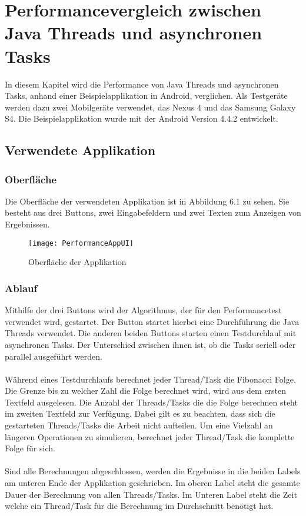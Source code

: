 \chapter[Performancevergleich zwischen Java Threads und asynchronen Tasks] {Performancevergleich zwischen Java Threads und asynchronen Tasks}       
\label{cha:performance}

In diesem Kapitel wird die Performance von Java Threads und asynchronen Tasks, anhand einer Beispielapplikation in Android, verglichen. Als Testgeräte werden dazu zwei Mobilgeräte verwendet, das Nexus 4 und das Samsung Galaxy S4. Die Beispielapplikation wurde mit der Android Version 4.4.2 entwickelt.

\section{Verwendete Applikation}
\subsection{Oberfläche}
Die Oberfläche der verwendeten Applikation ist in Abbildung 6.1 zu sehen. Sie besteht aus drei Buttons, zwei Eingabefeldern und zwei Texten zum Anzeigen von Ergebnissen.

\begin{figure}
\centering
\texttt{[image: PerformanceAppUI]}
\caption{Oberfläche der Applikation}
\label{fig:PerformanceAppUI}
\end{figure}

\subsection{Ablauf}
Mithilfe der drei Buttons wird der Algorithmus, der für den Performancetest verwendet wird, gestartet. Der Button  startet hierbei eine Durchführung die Java Threads verwendet. Die anderen beiden Buttons starten einen Testdurchlauf mit asynchronen Tasks. Der Unterschied zwischen ihnen ist, ob die Tasks seriell oder parallel ausgeführt werden.
\\
\\
Während eines Testdurchlaufs berechnet jeder Thread/Task die Fibonacci Folge. Die Grenze bis zu welcher Zahl die Folge berechnet wird, wird aus dem ersten Textfeld ausgelesen. Die Anzahl der Threads/Tasks die die Folge berechnen steht im zweiten Textfeld zur Verfügung. Dabei gilt es zu beachten, dass sich die gestarteten Threads/Tasks die Arbeit nicht aufteilen. Um eine Vielzahl an längeren Operationen zu simulieren, berechnet jeder Thread/Task die komplette Folge für sich.
\\
\\
Sind alle Berechnungen abgeschlossen, werden die Ergebnisse in die beiden Labels am unteren Ende der Applikation geschrieben. Im oberen Label steht die gesamte Dauer der Berechnung von allen Threads/Tasks. Im Unteren Label steht die Zeit welche ein Thread/Task für die Berechnung im Durchschnitt benötigt hat.

